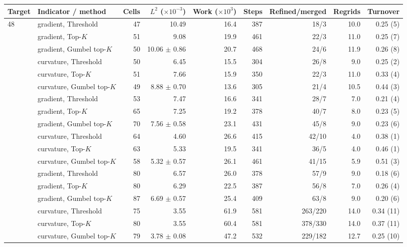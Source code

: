 \begin{tabular}{llrrrrrrr}
\toprule
Target & Indicator / method & Cells & $L^2$ ($\times10^{-3}$) & Work ($\times10^{3}$) & Steps & Refined/merged & Regrids & Turnover \\
\midrule
48 & gradient, Threshold & 47 & 10.49 & 16.4 & 387 & 18/3 & 10.0 & 0.25 (5) \\
 & gradient, Top-$K$ & 51 & 9.08 & 19.9 & 461 & 22/3 & 11.0 & 0.25 (7) \\
 & gradient, Gumbel top-$K$ & 50 & 10.06 $\pm$ 0.86 & 20.7 & 468 & 24/6 & 11.9 & 0.26 (8) \\
 & curvature, Threshold & 50 & 6.45 & 15.5 & 304 & 26/8 & 9.0 & 0.25 (2) \\
 & curvature, Top-$K$ & 51 & 7.66 & 15.9 & 350 & 22/3 & 11.0 & 0.33 (4) \\
 & curvature, Gumbel top-$K$ & 49 & 8.88 $\pm$ 0.70 & 13.6 & 305 & 21/4 & 10.5 & 0.44 (3) \\
\addlinespace
64 & gradient, Threshold & 53 & 7.47 & 16.6 & 341 & 28/7 & 7.0 & 0.21 (4) \\
 & gradient, Top-$K$ & 65 & 7.25 & 19.2 & 378 & 40/7 & 8.0 & 0.23 (5) \\
 & gradient, Gumbel top-$K$ & 70 & 7.56 $\pm$ 0.58 & 23.1 & 431 & 45/8 & 9.0 & 0.23 (6) \\
 & curvature, Threshold & 64 & 4.60 & 26.6 & 415 & 42/10 & 4.0 & 0.38 (1) \\
 & curvature, Top-$K$ & 63 & 5.33 & 19.5 & 341 & 36/5 & 4.0 & 0.46 (1) \\
 & curvature, Gumbel top-$K$ & 58 & 5.32 $\pm$ 0.57 & 26.1 & 461 & 41/15 & 5.9 & 0.51 (3) \\
\addlinespace
80 & gradient, Threshold & 80 & 6.57 & 26.0 & 378 & 57/9 & 9.0 & 0.18 (6) \\
 & gradient, Top-$K$ & 80 & 6.29 & 22.5 & 387 & 56/8 & 7.0 & 0.26 (4) \\
 & gradient, Gumbel top-$K$ & 87 & 6.69 $\pm$ 0.57 & 25.4 & 409 & 63/8 & 9.0 & 0.20 (6) \\
 & curvature, Threshold & 75 & 3.55 & 61.9 & 581 & 263/220 & 14.0 & 0.34 (11) \\
 & curvature, Top-$K$ & 80 & 3.55 & 60.4 & 581 & 378/330 & 14.0 & 0.37 (11) \\
 & curvature, Gumbel top-$K$ & 79 & 3.78 $\pm$ 0.08 & 47.2 & 532 & 229/182 & 12.7 & 0.25 (10) \\
\bottomrule
\end{tabular}
